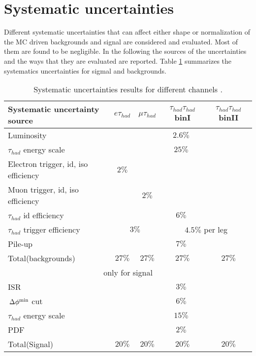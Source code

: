 \section{Systematic uncertainties}
\label{sect:sys}
Different systematic uncertainties that can affect either shape or normalization of the MC driven backgrounds
and signal are considered and evaluated.
Most of them are found to be negligible. In the following the sources of the uncertainties and the ways that they are evaluated are reported. 
Table \ref{Tab.SYS} summarizes the systematics uncertainties for sigmal and backgrounds.
\begin{table}[!Hhtb]
\begin{center}
\small{
\begin{tabular}{|l|c|c|c|c|}
\hline\hline
Systematic uncertainty source & $e\tau_{had}$ & $\mu\tau_{had}$ & $\tau_{had}\tau_{had}$ binI & $\tau_{had}\tau_{had}$ binII\\
\hline\hline
{Luminosity}&\multicolumn{4}{c|}{$2.6\%$} \\\hline
{$\tau_{had}$ energy scale}&\multicolumn{4}{c|}{$25\%$} \\\hline
{Electron trigger, id, iso efficiency}& $2\%$ & \multicolumn{3}{c|}{} \\\hline
{Muon trigger, id, iso efficiency}& &$2\%$ & \multicolumn{2}{c|}{} \\\hline
{$\tau_{had}$ id efficiency}& \multicolumn{4}{c|}{$6\%$} \\\hline
{$\tau_{had}$ trigger efficiency}& \multicolumn{2}{c|}{$3\%$}&\multicolumn{2}{c|}{$4.5\%$ per leg} \\\hline
{Pile-up}&\multicolumn{4}{c|}{$7\%$} \\\hline
Total(backgrounds) & $27\%$ & $27\%$ & $27\%$  & $27\%$\\\hline
\multicolumn{5}{|c|}{only for signal} \\\hline
{ISR}&\multicolumn{4}{c|}{$3\%$} \\\hline
{$\,{\Delta\phi^{\rm min}}$ cut}&\multicolumn{4}{c|}{$6\%$} \\\hline
{$\tau_{had}$ energy scale}&\multicolumn{4}{c|}{$15\%$} \\\hline
{PDF}&\multicolumn{4}{c|}{$2\%$} \\\hline
Total(Signal) & $20\%$ & $20\%$ & $20\%$  & $20\%$\\
\hline
\hline
\end{tabular}
}
\end{center}
\caption{
  Systematic uncertainties results for different channels .
}
\label{Tab.SYS}
\end{table}

